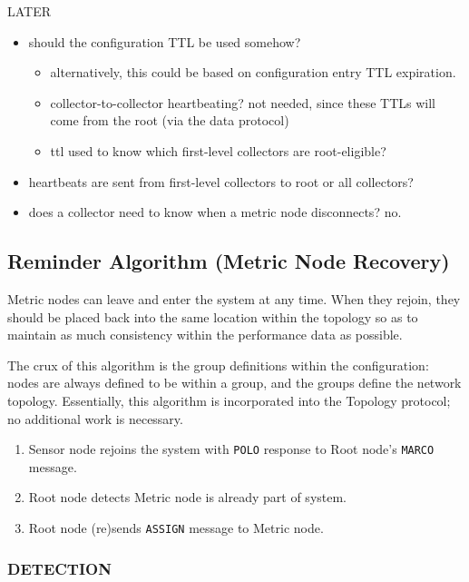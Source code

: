 LATER

\begin{itemize}
\item should the configuration TTL be used somehow?
      \begin{itemize}
      \item alternatively, this could be based on configuration entry TTL expiration.
      \item collector-to-collector heartbeating? not needed, since these TTLs will come from the root (via the data protocol)
      \item ttl used to know which first-level collectors are root-eligible?
      \end{itemize}
\item heartbeats are sent from first-level collectors to root or all collectors?
\item does a collector need to know when a metric node disconnects? no.
\end{itemize}

\subsection{Reminder Algorithm (Metric Node Recovery)}
\label{algor_remind}

Metric nodes can leave and enter the \dcamp system at any time. When they rejoin, they should be placed back into the
same location within the topology so as to maintain as much consistency within the performance data as possible.

The crux of this algorithm is the group definitions within the \dcamp configuration: nodes are always defined to be
within a group, and the groups define the network topology. Essentially, this algorithm is incorporated into the
Topology protocol; no additional work is necessary.

\begin{enumerate}
\item Sensor node rejoins the system with \texttt{POLO} response to Root node's \texttt{MARCO} message.
\item Root node detects Metric node is already part of \dcamp system.
\item Root node (re)sends \texttt{ASSIGN} message to Metric node.
\end{enumerate}

\subsubsection{DETECTION}

